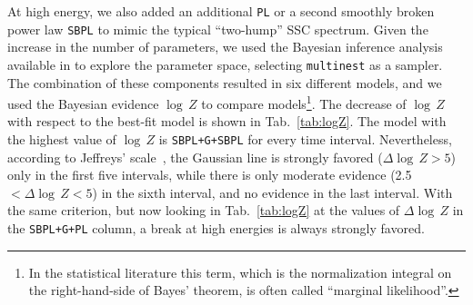 \documentclass[preprint]{aastex631}
\begin{document}
At high energy, we also added an additional \texttt{PL} or a second smoothly broken power law \texttt{SBPL} to mimic the typical ``two-hump'' SSC spectrum. Given the increase in the number of parameters, we used the Bayesian inference analysis available in \ThreeML to explore the parameter space, selecting \texttt{multinest} \citep{Multinest} as a sampler.
The combination of these components resulted in six different models, and we used the Bayesian evidence $\log\,Z$ to compare models\footnote{In the statistical literature this term, which is the normalization integral on the right-hand-side of Bayes' theorem, is often called ``marginal likelihood''.}. 
The decrease of $\log\,Z$ with respect to the best-fit model is shown in Tab.~\ref{tab:logZ}. 
The model with the highest value of $\log\,Z$ is \texttt{SBPL+G+SBPL} for every time interval. 
Nevertheless, according to Jeffreys' scale~\citep{Jeffreys}, the Gaussian line is strongly favored ($\Delta \log\,Z > 5$) only in the first five intervals, while there is only moderate evidence (2.5$< \Delta \log\,Z < 5$) in the sixth interval, and no evidence in the last interval. 
With the same criterion, but now looking in Tab.~\ref{tab:logZ} at the values of $\Delta \log\,Z$ in the \texttt{SBPL+G+PL} column, a break at high energies is always strongly favored.
\end{document}
